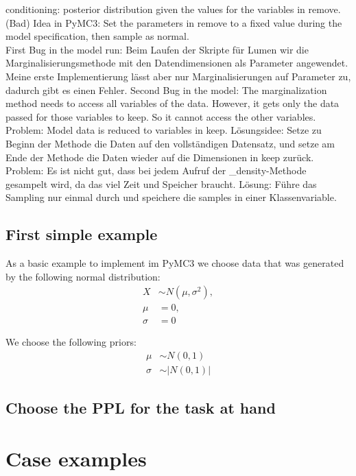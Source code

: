 \documentclass{article}
\begin{document}
conditioning: posterior distribution given the values for the variables in remove. (Bad) Idea in PyMC3: Set the parameters in remove to a fixed value during the model specification, then sample as normal.
\\
First Bug in the model run: Beim Laufen der Skripte für Lumen wir die Marginalisierungsmethode mit den Datendimensionen als Parameter angewendet. Meine erste Implementierung lässt aber nur Marginalisierungen auf Parameter zu, dadurch gibt es einen Fehler.
Second Bug in the model: The marginalization method needs to access all variables of the data. However, it gets only the data passed for those variables to keep. So it cannot access the other variables. 
Problem: Model data is reduced to variables in keep. Lösungsidee: Setze zu Beginn der Methode die Daten auf den vollständigen Datensatz, und setze am Ende der Methode die Daten wieder auf die Dimensionen in keep zurück.
\\
Problem: Es ist nicht gut, dass bei jedem Aufruf der \_density-Methode gesampelt wird, da das viel Zeit und Speicher braucht. Lösung: Führe das Sampling nur einmal durch und speichere die samples in einer Klassenvariable.
\subsection{First simple example}
As a basic example to implement im PyMC3 we choose data that was generated by the following normal distribution:
\begin{equation}
\begin{split}
	X &\sim N(\mu,\sigma^2), \\
	\mu &= 0, \\
	\sigma &= 0
\end{split}
\end{equation}

We choose the following priors:
\begin{equation}
\begin{split}
\mu &\sim N(0,1) \\
\sigma &\sim |N(0,1)|
\end{split}
\end{equation}

\subsection{Choose the PPL for the task at hand}

\section{Case examples}
\end{document}
